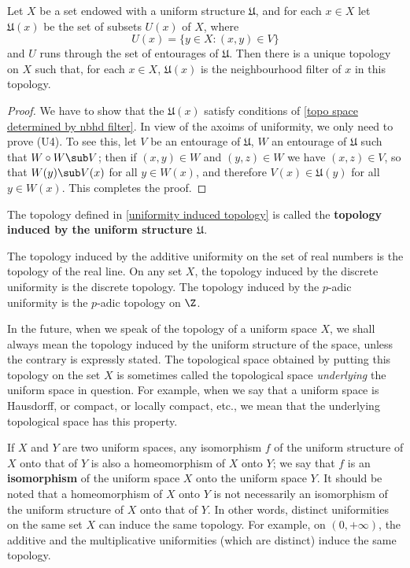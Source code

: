 \begin{proposition}\label{uniformity induced topology}
Let $X$ be a set endowed with a uniform structure $\mathfrak{U}$, and for each $x\in X$ let $\mathfrak{U}(x)$ be the set of subsets $U(x)$ of $X$, where
\[U(x)=\{y\in X:(x,y)\in V\}\]
and $U$ runs through the set of entourages of $\mathfrak{U}$. Then there is a unique topology on $X$ such that, for each $x\in X$, $\mathfrak{U}(x)$ is the neighbourhood filter of $x$ in this topology.
\end{proposition}
\begin{proof}
We have to show that the $\mathfrak{U}(x)$ satisfy conditions of \cref{topo space determined by nbhd filter}. In view of the axoims of uniformity, we only need to prove (U4). To see this, let $V$ be an entourage of $\mathfrak{U}$, $W$ an entourage of $\mathfrak{U}$ such that $W\circ W\sub V$; then if $(x,y)\in W$ and $(y,z)\in W$ we have $(x,z)\in V$, so that $W(y)\sub V(x)$ for all $y\in W(x)$, and therefore $V(x)\in\mathfrak{U}(y)$ for all $y\in W(x)$. This completes the proof.
\end{proof}
The topology defined in \cref{uniformity induced topology} is called the \textbf{topology induced by the uniform structure $\mathfrak{U}$}.
\begin{example}
The topology induced by the additive uniformity on the set of real numbers is the topology of the real line. On any set $X$, the topology induced by the discrete uniformity is the discrete topology. The topology induced by the $p$-adic uniformity is the $p$-adic topology on $\Z$.
\end{example}
In the future, when we speak of the topology of a uniform space $X$, we shall always mean the topology induced by the uniform structure of the space, unless the contrary is expressly stated. The topological space obtained by putting this topology on the set $X$ is sometimes called the topological space \textit{underlying} the uniform space in question. For example, when we say that a uniform space is Hausdorff, or compact, or locally compact, etc., we mean that the underlying topological space has this property.\par
If $X$ and $Y$ are two uniform spaces, any isomorphism $f$ of the uniform structure of $X$ onto that of $Y$ is also a homeomorphism of $X$ onto $Y$; we say that $f$ is an \textbf{isomorphism} of the uniform space $X$ onto the uniform space $Y$. It should be noted that a homeomorphism of $X$ onto $Y$ is not necessarily an isomorphism of the uniform structure
of $X$ onto that of $Y$. In other words, distinct uniformities on the same set $X$ can induce the same topology. For example, on $(0,+\infty)$, the additive and the multiplicative uniformities (which are distinct) induce the same topology.
